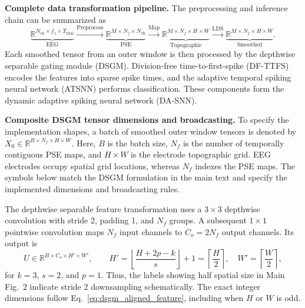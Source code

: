 ﻿\documentclass[12pt]{article}
\begin{document}
\textbf{Complete data transformation pipeline.}
The preprocessing and inference chain can be summarized as
\begin{equation}
\underbrace{\mathbb{R}^{N_{\mathrm{ch}} \times f_s \times T_{\mathrm{trial}}}}_{\text{EEG}}
\!\xrightarrow{\text{Preprocess}}\!
\underbrace{\mathbb{R}^{M \times N_f \times N_{\mathrm{ch}}}}_{\text{PSE}}
\!\xrightarrow{\text{Map}}\!
\underbrace{\mathbb{R}^{M \times N_f \times H \times W}}_{\text{Topographic}}
\!\xrightarrow{\text{LDS}}\!
\underbrace{\mathbb{R}^{M \times N_f \times H \times W}}_{\text{Smoothed}}.
\label{eq:preprocessing_pipeline}
\end{equation}
Each smoothed tensor from an outer window is then processed by the depthwise separable gating module (DSGM). Division-free time-to-first-spike (DF-TTFS) encodes the features into sparse spike times, and the adaptive temporal spiking neural network (ATSNN) performs classification. These components form the dynamic adaptive spiking neural network (DA-SNN).

\textbf{Composite DSGM tensor dimensions and broadcasting.}
To specify the implementation shapes, a batch of smoothed outer window tensors is denoted by $X_0\in\mathbb{R}^{B\times N_f\times H\times W}$. Here, $B$ is the batch size, $N_f$ is the number of temporally contiguous PSE maps, and $H\times W$ is the electrode topographic grid. EEG electrodes occupy spatial grid locations, whereas $N_f$ indexes the PSE maps. The symbols below match the DSGM formulation in the main text and specify the implemented dimensions and broadcasting rules.

The depthwise separable feature transformation uses a $3\times3$ depthwise convolution with stride 2, padding 1, and $N_f$ groups. A subsequent $1\times1$ pointwise convolution maps $N_f$ input channels to $C_o=2N_f$ output channels. Its output is
\begin{equation}
U\in\mathbb{R}^{B\times C_o\times H'\times W'},\qquad
H'=\left\lfloor\frac{H+2p-k}{s}\right\rfloor+1=\left\lceil\frac{H}{2}\right\rceil,\quad
W'=\left\lceil\frac{W}{2}\right\rceil,
\label{eq:dsgm_aligned_feature}
\end{equation}
for $k=3$, $s=2$, and $p=1$. Thus, the labels showing half spatial size in Main Fig.~2 indicate stride 2 downsampling schematically. The exact integer dimensions follow Eq.~\ref{eq:dsgm_aligned_feature}, including when $H$ or $W$ is odd.
\end{document}
